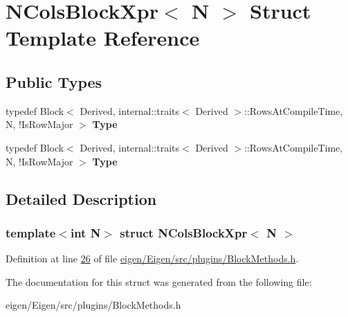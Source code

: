 \hypertarget{struct_n_cols_block_xpr}{}\section{N\+Cols\+Block\+Xpr$<$ N $>$ Struct Template Reference}
\label{struct_n_cols_block_xpr}
\subsection*{Public Types}
\begin{DoxyCompactItemize}
\item 
\mbox{\label{struct_n_cols_block_xpr_a921aa6f221f8f0036c04c8d0046f22dc}} 
typedef Block$<$ Derived, internal\+::traits$<$ Derived $>$\+::Rows\+At\+Compile\+Time, N, !Is\+Row\+Major $>$ {\bfseries Type}
\item 
\mbox{\label{struct_n_cols_block_xpr_a921aa6f221f8f0036c04c8d0046f22dc}} 
typedef Block$<$ Derived, internal\+::traits$<$ Derived $>$\+::Rows\+At\+Compile\+Time, N, !Is\+Row\+Major $>$ {\bfseries Type}
\end{DoxyCompactItemize}


\subsection{Detailed Description}
\subsubsection*{template$<$int N$>$\newline
struct N\+Cols\+Block\+Xpr$<$ N $>$}



Definition at line \hyperlink{eigen_2_eigen_2src_2plugins_2_block_methods_8h_source_l00026}{26} of file \hyperlink{eigen_2_eigen_2src_2plugins_2_block_methods_8h_source}{eigen/\+Eigen/src/plugins/\+Block\+Methods.\+h}.



The documentation for this struct was generated from the following file\+:\begin{DoxyCompactItemize}
\item 
eigen/\+Eigen/src/plugins/\+Block\+Methods.\+h\end{DoxyCompactItemize}
